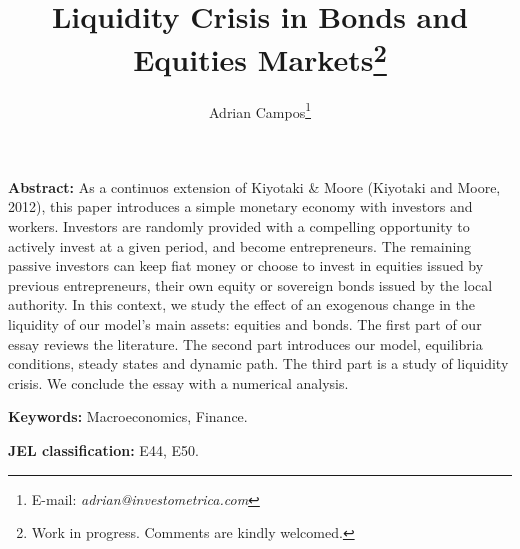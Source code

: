 \documentclass[12pt]{article}%
\begin{document}
\title{Liquidity Crisis in Bonds and Equities Markets\thanks{Work in progress. Comments are kindly welcomed.}}
\author{Adrian Campos\thanks{E-mail: \textit{adrian@investometrica.com}}}

\maketitle

\sloppy%

\onehalfspacing

\textbf{Abstract:}
As a continuos extension of Kiyotaki \& Moore (Kiyotaki and Moore, 2012), this paper
introduces a simple monetary economy with investors and workers. Investors are
randomly provided with a compelling opportunity to actively invest at a given period, and
become entrepreneurs. The remaining passive investors can keep fiat money or choose
to invest in equities issued by previous entrepreneurs, their own equity or 
sovereign bonds issued by the local authority. In this context, we study the
effect of an exogenous change in the liquidity of our model's main assets: equities and bonds. 
The first part of our essay reviews the literature. The second part introduces our model, equilibria
conditions, steady states and dynamic path. The third part is a study of liquidity crisis.
We conclude the essay with a numerical analysis.
\strut

\textbf{Keywords:} Macroeconomics, Finance.

\strut
\textbf{JEL classification:} E44, E50.

\strut
\pagebreak%
\nocite{jimenez,so,galor2010,carranzapipi,angus11,dell,tepaske,livi,wawa,INEI6,ruralperu,goo,cook1,liao,diebolt,toda,braun,bauer,guinnane,UN1,latinfertil,luis2,INEI1,INEI2,INEI3,INEI4,INEI5,shi1,
lee1,lord,razin,tour1,tilak,chase,colombia,nicolini,galor2000,galor2005,doepke2005,INEI8,
tour2,day,chen,fertilitypalivos,palivos2,yip,doepke,galor,barro2,barro1,wang-theoryandevidence,tamura2,
becker1,barro3,barro4,k1,s1,s2,s3,s4,s5,s6,lehmijoki,ahituv,barrobecker2,barrobecker1,dobyns,ww,huenefeld,contreras2010}
\end{document}
